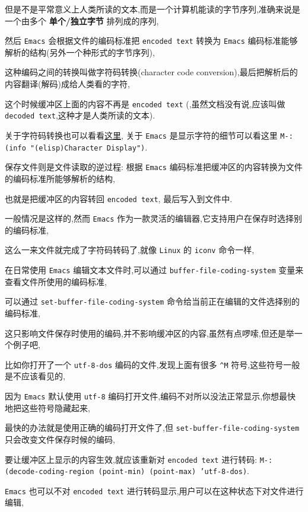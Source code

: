 \documentclass[11pt]{article}
\begin{document}
但是不是平常意义上人类所读的文本,而是一个计算机能读的字节序列,准确来说是一个由多个 \textbf{单个/独立字节} 排列成的序列,

然后 \texttt{Emacs} 会根据文件的编码标准把 \texttt{encoded text} 转换为 \texttt{Emacs} 编码标准能够解析的结构(另外一个种形式的字节序列),

这种编码之间的转换叫做字符码转换(character code conversion),最后把解析后的内容翻译(解码)成给人类看的字符,

这个时候缓冲区上面的内容不再是 \texttt{encoded text} (,虽然文档没有说,应该叫做 \texttt{decoded text},这种才是人类所读的文本).

关于字符码转换也可以看看\href{https://www.ibm.com/support/knowledgecenter/ssw\_ibm\_i\_74/db2/rbafzccseta.htm}{这里}, 关于 \texttt{Emacs} 是显示字符的细节可以看这里 \texttt{M-: (info "(elisp)Character Display")}.

保存文件则是文件读取的逆过程: 根据 \texttt{Emacs} 编码标准把缓冲区的内容转换为文件的编码标准所能够解析的结构,

也就是把缓冲区的内容转回 \texttt{encoded text}, 最后写入到文件中.

一般情况是这样的,然而 \texttt{Emacs} 作为一款灵活的编辑器,它支持用户在保存时选择别的编码标准,

这么一来文件就完成了字符码转码了,就像 \texttt{Linux} 的 \texttt{iconv} 命令一样,

在日常使用 \texttt{Emacs} 编辑文本文件时,可以通过 \texttt{buffer-file-coding-system} 变量来查看文件所使用的编码标准,

可以通过 \texttt{set-buffer-file-coding-system} 命令给当前正在编辑的文件选择别的编码标准,

这只影响文件保存时使用的编码,并不影响缓冲区的内容,虽然有点啰嗦,但还是举一个例子吧,

比如你打开了一个 \texttt{utf-8-dos} 编码的文件,发现上面有很多 \texttt{\textasciicircum{}M} 符号,这些符号一般是不应该看见的,

因为 \texttt{Emacs} 默认使用 \texttt{utf-8} 编码打开文件,编码不对所以没法正常显示,你想最快地把这些符号隐藏起来,

最快的办法就是使用正确的编码打开文件了,但 \texttt{set-buffer-file-coding-system} 只会改变文件保存时候的编码,

要让缓冲区上显示的内容生效,就应该重新对 \texttt{encoded text} 进行转码: \texttt{M-: (decode-coding-region (point-min) (point-max) 'utf-8-dos)}.

\texttt{Emacs} 也可以不对 \texttt{encoded text} 进行转码显示,用户可以在这种状态下对文件进行编辑,
\end{document}
